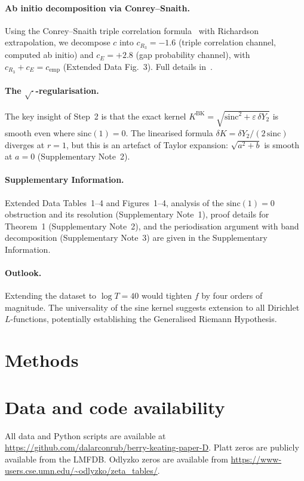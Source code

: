\documentclass[10pt]{article}
\begin{document}
\paragraph{Ab initio decomposition via Conrey--Snaith.}
Using the Conrey--Snaith triple correlation formula~\cite{conrey2005}
with Richardson extrapolation, we decompose $c$ into $c_{R_3} = -1.6$
(triple correlation channel, computed ab initio) and $c_E = +2.8$
(gap probability channel), with $c_{R_3} + c_E = c_{\mathrm{emp}}$
(Extended Data Fig.~3). Full details in~\cite{alarcon2026b}.

\paragraph{The $\sqrt{\cdot}$-regularisation.}
The key insight of Step~2 is that the exact kernel
$K^{\mathrm{BK}} = \sqrt{\mathrm{sinc}^2 + \varepsilon\,\delta Y_2}$ is
smooth even where $\mathrm{sinc}(1) = 0$. The linearised formula
$\delta K = \delta Y_2/(2\,\mathrm{sinc})$ diverges at $r = 1$, but this
is an artefact of Taylor expansion: $\sqrt{a^2 + b}$ is smooth at $a = 0$
(Supplementary Note~2).

\paragraph{Supplementary Information.}
Extended Data Tables~1--4 and Figures~1--4, analysis of the
$\mathrm{sinc}(1) = 0$ obstruction and its resolution
(Supplementary Note~1), proof details for Theorem~1
(Supplementary Note~2), and the periodisation argument with band
decomposition (Supplementary Note~3) are given in the Supplementary
Information.

\paragraph{Outlook.}
Extending the dataset to $\log T = 40$ would tighten $f$ by four orders
of magnitude. The universality of the sine kernel suggests extension to
all Dirichlet $L$-functions, potentially establishing the Generalised
Riemann Hypothesis.


\section*{Methods}



\section*{Data and code availability}
All data and Python scripts are available at
\url{https://github.com/dalarconrub/berry-keating-paper-D}.
Platt zeros are publicly available from the LMFDB.
Odlyzko zeros are available from
\url{https://www-users.cse.umn.edu/~odlyzko/zeta_tables/}.
\end{document}
